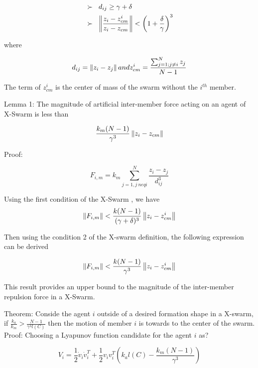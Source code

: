 \begin{align*}
&\succ\hspace{0.2cm}  d_{ij} \geq \gamma + \delta \\
&\succ \hspace{0.2cm}   \left\lVert\frac{z_i - z_{cm}^i}{z_i - z_{cm}}\right\rVert < \left(1+\frac{\delta}{\gamma}\right)^3
\end{align*}

where

\begin{equation}
 d_{ij} = \left\lVert z_i - z_j\right\rVert and z_{cm}^i = \frac{\sum_{j=1; j\neq i}^{N} z_j}{N-1}
\end{equation}

The term of $z_{cm}^i$ is the center of mass of the swarm without the $i^{th}$ member.

Lemma 1: The magnitude of artificial inter-member force acting on an agent of X-Swarm  is less than

\begin{equation}
\frac{k_m(N-1)}{\gamma ^3} \left\lVert z_i - z_{cm}\right\rVert
\end{equation}

Proof:

\begin{equation}
F_{i,m} = k_m \sum_{j=1, j\ neq i}^{N} \frac{z_i - z_j}{d_{ij}^3} 
\end{equation}

Using the first condition of the X-Swarm , we have
\begin{equation}
\left\lVert F_{i,m}\right\rVert < \frac{k(N-1)}{(\gamma + \delta)^3} \left\lVert z_i - z_{cm}^i\right\rVert
\end{equation}

Then using the condition 2 of the X-swarm definition, the following expression can be derived

\begin{equation}
\left\lVert F_{i,m}\right\rVert < \frac{k(N-1)}{\gamma^3} \left\lVert z_i - z_{cm}^i\right\rVert
\end{equation}

This result provides an upper bound to the magnitude of the inter-member repulsion force in a X-Swarm.  
		
Theorem: Conside the agent $i$	outside of a desired formation shape in a X-swarm, if $\frac{k_a}{k_m} > \frac{N-1}{\gamma^3  l(C)}$ then the motion of member $i$ is towards to the center of the swarm. 
Proof: Choosing a Lyapunov function candidate for the agent $i$ as?

\begin{equation}
V_i = \frac{1}{2} \dot{v}_i \dot{v}_i^T + \frac{1}{2} v_i v_i^T\left(k_al(C)-\frac{k_m(N-1)}{\gamma^3}\right) 
\end{equation}

